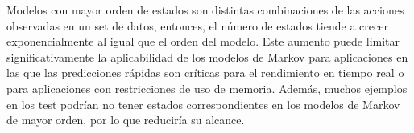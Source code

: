 Modelos con mayor orden de estados son distintas combinaciones de las acciones observadas en un set de datos, entonces, el número de estados tiende a crecer exponencialmente al igual que el orden del modelo. 
Este aumento puede limitar significativamente la aplicabilidad de los modelos de Markov para aplicaciones en las que las predicciones rápidas son críticas para el rendimiento en tiempo real o para aplicaciones con restricciones de uso de memoria. Además, muchos ejemplos en los test podrían no tener estados correspondientes en los modelos de Markov de mayor orden, por lo que reduciría su alcance.

